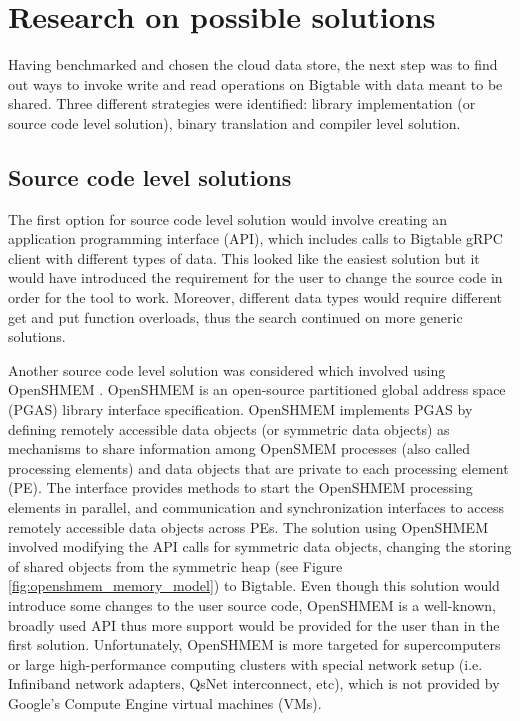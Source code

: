 \documentclass[bsc,frontabs,twoside,singlespacing,parskip,deptreport]{infthesis}     %
\begin{document}
\section{Research on possible solutions}


Having benchmarked and chosen the cloud data store, the next step was to find out ways to invoke write and read operations on Bigtable with data meant to be shared. Three different strategies were identified: library implementation (or source code level solution), binary translation and compiler level solution.

\subsection{Source code level solutions}

The first option for source code level solution would involve creating an application programming interface (API), which includes calls to Bigtable gRPC client with different types of data. This looked like the easiest solution but it would have introduced the requirement for the user to change the source code in order for the tool to work. Moreover, different data types would require different get and put function overloads, thus the search continued on more generic solutions.

Another source code level solution was considered which involved using OpenSHMEM \citep{openshmem}. OpenSHMEM is an open-source partitioned global address space (PGAS) library interface specification. OpenSHMEM implements PGAS by defining remotely accessible data objects (or symmetric data objects) as mechanisms to share information among OpenSMEM processes (also called processing elements) and data objects that are private to each processing element (PE). The interface provides methods to start the OpenSHMEM processing elements in parallel, and communication and synchronization interfaces to access remotely accessible data objects across PEs. The solution using OpenSHMEM involved modifying the API calls for symmetric data objects, changing the storing of shared objects from the symmetric heap (see Figure \ref{fig:openshmem_memory_model}) to Bigtable. Even though this solution would introduce some changes to the user source code, OpenSHMEM is a well-known, broadly used API thus more support would be provided for the user than in the first solution. Unfortunately, OpenSHMEM is more targeted for supercomputers or large high-performance computing clusters with special network setup (i.e. Infiniband network adapters, QsNet interconnect, etc), which is not provided by Google's Compute Engine virtual machines (VMs).
\end{document}
